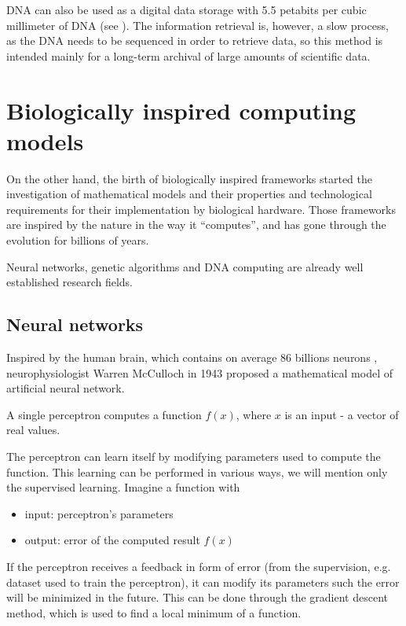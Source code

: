 DNA can also be used as a digital data storage with 5.5 petabits per cubic millimeter of DNA (see \cite{Church2012DNAStorage}). The information retrieval is, however, a slow process, as the DNA needs to be sequenced in order to retrieve data, so this method is intended mainly for a long-term archival of large amounts of scientific data.


\section{Biologically inspired computing models} %
\label{sec:biologically_inspired_computing_models}

On the other hand, the birth of biologically inspired frameworks started the investigation of mathematical models and their properties and technological requirements for their implementation by biological hardware.
Those frameworks are inspired by the nature in the way it ``computes'', and has gone through the evolution for billions of years.

Neural networks, genetic algorithms and DNA computing are already well established research fields.

\subsection{Neural networks} %
\label{sub:neural_networks}

Inspired by the human brain, which contains on average 86 billions neurons \cite{Azevedo09NumberOfNeurons}, neurophysiologist Warren McCulloch in 1943 proposed a mathematical model of artificial  neural network.

A single perceptron computes a function $f(x)$, where $x$ is an input - a vector of real values.

The perceptron can learn itself by modifying parameters used to compute the function. This learning can be performed in various ways, we will mention only the supervised learning. Imagine a function with
\begin{itemize}
  \item input: perceptron's parameters
  \item output: error of the computed result $f(x)$
\end{itemize}
If the perceptron receives a feedback in form of error (from the supervision, e.g. dataset used to train the perceptron), it can modify its parameters such the error will be minimized in the future. This can be done through the gradient descent method, which is used to find a local minimum of a function.

